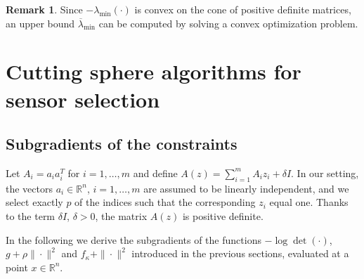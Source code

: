 \documentclass[12pt]{amsart}
\theoremstyle{plain}
\theoremstyle{definition}
\newtheorem{remark}[theorem]{Remark}
\begin{document}
\begin{remark}
Since $-\lambda_{\min}(\cdot)$ is convex on the cone of positive definite matrices, an upper bound $\overline{\lambda}_{\min}$ can be computed by solving a convex optimization problem.
\end{remark}
		

		
		
		
		\section{Cutting sphere algorithms for sensor selection}

\subsection{Subgradients of the constraints}

Let \(A_i = a_i a_i^T\) for \(i = 1, \dots, m\) and define \(A(z) = \sum_{i=1}^m A_i z_i + \delta I\). In our setting, the vectors \(a_i \in \mathbb{R}^n\), \(i = 1, \dots, m\) are assumed to be linearly independent, and we select exactly \(p\) of the indices such that the corresponding \(z_i\) equal one. Thanks to the term \(\delta I\), $\delta>0$, the matrix \(A(z)\) is positive definite.

In the following we derive the subgradients of the functions \(-\log\det(\cdot)\), \(g + \rho \|\cdot\|^2\) and \(f_\kappa + \|\cdot\|^2\) introduced in the previous sections, evaluated at a point \(x \in \mathbb{R}^n\).
\end{document}
